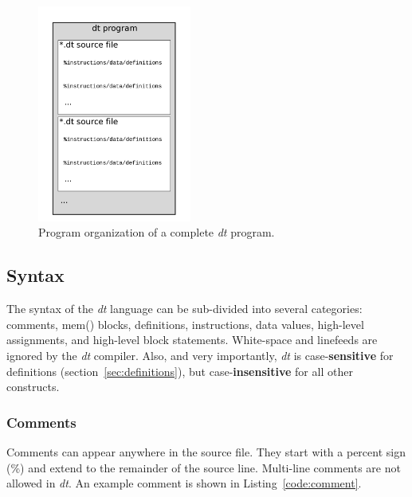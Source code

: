 \begin{figure}
\centering
\includegraphics[width=0.45\textwidth]{figs/dt-program.pdf}
\caption{Program organization of a complete \emph{dt} program.}
\label{pic:program}
\vspace{-1em}
\end{figure}



\subsection{Syntax}

The syntax of the \emph{dt} language can be sub-divided into
several categories: comments, mem() blocks, definitions, instructions, 
data values, high-level assignments, and high-level block statements.
White-space and linefeeds are ignored by the \emph{dt} 
compiler. Also, and very importantly, \emph{dt} is case-\textbf{sensitive} 
for definitions (section~\ref{sec:definitions}), but case-\textbf{insensitive} 
for all other constructs.

\subsubsection{Comments}

Comments can appear anywhere in the source file.  They start 
with a percent sign (\%) and extend to the remainder of the source line.
Multi-line comments are not allowed in \emph{dt}.  An example comment 
is shown in Listing~\ref{code:comment}.

